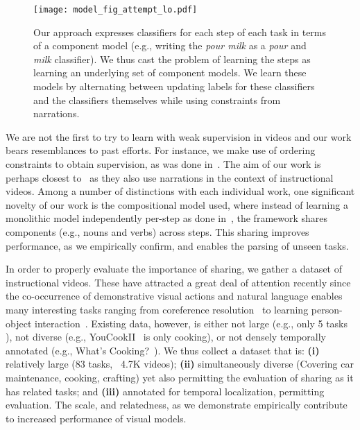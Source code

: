 \documentclass[10pt,twocolumn,letterpaper]{article}
\begin{document}
\begin{figure*}[t]
\begin{center}
   \texttt{[image: model\_fig\_attempt\_lo.pdf]}
\caption{Our approach expresses classifiers for each step of each task in terms
of a component model (e.g., writing the {\it pour milk} as a {\it pour} and
{\it milk} classifier). We thus cast the problem of learning
the steps as learning an underlying set of component models. We learn these
models by alternating between updating labels for these classifiers and the
classifiers themselves while using constraints from narrations. }
\label{fig:method}
\vspace{-0.25in}
\end{center}
\end{figure*}

We are not the first to try to learn with weak supervision in videos and our
work bears resemblances to past efforts. For instance, we make use of ordering
constraints to obtain supervision, as was done in~\cite{Bojanowski14weakly,feifei2016connectionist,kuehne17weakly,richard17weakly,Bojanowski15weakly}.
The aim of our work is perhaps closest to~\cite{Alayrac15Unsupervised,Malmaud15what,Sener15unsupervised} as they also use narrations in the context of instructional videos.
Among a number of distinctions with each individual work, one significant
novelty of our work is the compositional model used, where instead of learning
a monolithic model independently per-step as done
in~\cite{Alayrac15Unsupervised, Sener15unsupervised}, the framework shares
components (e.g., nouns and verbs) across steps. This sharing improves performance, as we empirically confirm, and enables the parsing of unseen tasks.

In order to properly evaluate the importance of sharing, we gather a dataset of
instructional videos. These have attracted a great deal of attention recently
\cite{Alayrac15Unsupervised,alayrac16objectstates,huang17unsupervised,huang18finding,Malmaud15what,Sener15unsupervised,zhou18towards}
since the co-occurrence of demonstrative visual actions and natural language
enables many interesting tasks ranging from coreference
resolution~\cite{huang17unsupervised} to learning person-object
interaction~\cite{alayrac16objectstates,dima2014youdo}. Existing data, however, is either
not large (e.g., only 5 tasks \cite{alayrac16objectstates}), not diverse (e.g.,
YouCookII~\cite{zhou18towards} is only cooking), or not densely temporally annotated
(e.g., What's Cooking?~\cite{Malmaud15what}).
We thus collect a dataset that is: {\bf (i)} relatively large (83 tasks, ~4.7K videos);
{\bf (ii)} simultaneously diverse (Covering car maintenance, cooking, crafting)
yet also permitting the evaluation of sharing as it has
related tasks; and {\bf (iii)} annotated for temporal localization,
permitting evaluation.  The scale, and relatedness, as we demonstrate
empirically contribute to increased performance of visual models.
\end{document}
